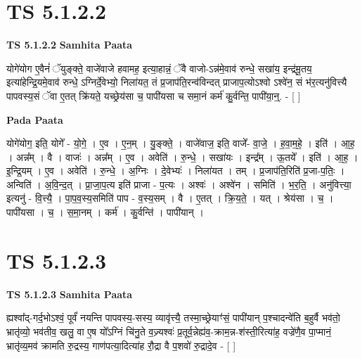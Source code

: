 \documentclass[17pt]{extarticle}
\begin{document}

\section{ TS 5.1.2.2 }

\textbf{TS 5.1.2.2 } \newline
\textbf{Samhita Paata} \newline

योगे॑योग ए॒वैनं॑ ॅयुङ्क्ते॒ वाजे॑वाजे हवामह॒ इत्या॒हान्नं॒ ॅवै वाजो-ऽन्न॑मे॒वाव॑ रुन्धे॒ सखा॑य॒ इन्द्र॑मू॒तय॒ इत्या॑हेन्द्रि॒यमे॒वाव॑ रुन्धे॒ ऽग्निर्दे॒वेभ्यो॒ निला॑यत॒ तं प्र॒जाप॑ति॒रन्व॑विन्दत् प्राजाप॒त्योऽश्वो ऽश्वे॑न॒ सं भ॑र॒त्यनु॑वित्त्यै पापवस्य॒सं ॅवा ए॒तत् क्रि॑यते॒ यच्छ्रेय॑सा च॒ पापी॑यसा च समा॒नं कर्म॑ कु॒र्वन्ति॒ पापी॑या॒न्॒. - [  ] \newline

\textbf{Pada Paata} \newline

योगे॑योग॒ इति॒ योगे᳚ - यो॒गे॒ । ए॒व । ए॒न॒म् । यु॒ङ्क्ते॒ । वाजे॑वाज॒ इति॒ वाजे᳚- वा॒जे॒ । ह॒वा॒म॒हे॒ । इति॑ । आ॒ह॒ । अन्न᳚म् । वै । वाजः॑ । अन्न᳚म् । ए॒व । अवेति॑ । रु॒न्धे॒ । सखा॑यः । इन्द्र᳚म् । ऊ॒तये᳚ । इति॑ । आ॒ह॒ । इ॒न्द्रि॒यम् । ए॒व । अवेति॑ । रु॒न्धे॒ । अ॒ग्निः । दे॒वेभ्यः॑ । निला॑यत । तम् । प्र॒जाप॑ति॒रिति॑ प्र॒जा-प॒तिः॒ । अन्विति॑ । अ॒वि॒न्द॒त् । प्रा॒जा॒प॒त्य इति॑ प्राजा - प॒त्यः । अश्वः॑ । अश्वे॑न । समिति॑ । भ॒र॒ति॒ । अनु॑वित्त्या॒ इत्यनु॑ - वि॒त्त्यै॒ । पा॒प॒व॒स्य॒समिति॑ पाप - व॒स्य॒सम् । वै । ए॒तत् । क्रि॒य॒ते॒ । यत् । श्रेय॑सा । च॒ । पापी॑यसा । च॒ । स॒मा॒नम् । कर्म॑ । कु॒र्वन्ति॑ । पापी॑यान् ।  \newline





\section{ TS 5.1.2.3 }

\textbf{TS 5.1.2.3 } \newline
\textbf{Samhita Paata} \newline

ह्यश्वा᳚द्-गर्द॒भोऽश्वं॒ पूर्वं॑ नयन्ति पापवस्य॒-सस्य॒ व्यावृ॑त्त्यै॒ तस्मा॒च्छ्रेयाꣳ॑सं॒ पापी॑यान् प॒श्चादन्वे॑ति ब॒हुर्वै भव॑तो॒ भ्रातृ॑व्यो॒ भव॑तीव॒ खलु॒ वा ए॒ष यो᳚ऽग्निं चि॑नु॒ते व॒ज्र्यश्वः॑ प्र॒तूर्व॒न्नेह्य॑व॒-क्राम॒न्न-श॑स्ती॒रित्या॑ह॒ वज्रे॑णै॒व पा॒प्मानं॒ भ्रातृ॑व्य॒मव॑ क्रामति रु॒द्रस्य॒ गाण॑पत्या॒दित्या॑ह रौ॒द्रा वै प॒शवो॑ रु॒द्रादे॒व - [  ] \newline
\end{document}
